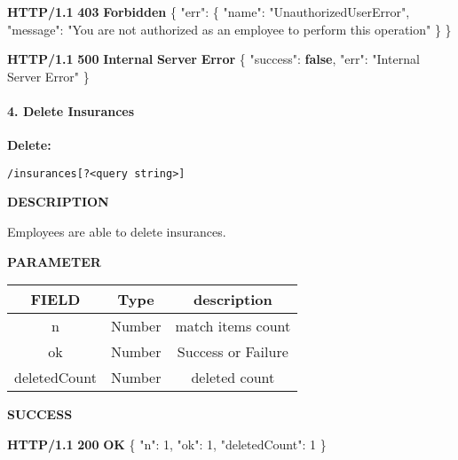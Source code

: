 \documentclass[
]{article}
\newenvironment{Shaded}{}{}
\newcommand{\DataTypeTok}[1]{\textcolor[rgb]{0.56,0.13,0.00}{#1}}
\newcommand{\DecValTok}[1]{\textcolor[rgb]{0.25,0.63,0.44}{#1}}
\newcommand{\ErrorTok}[1]{\textcolor[rgb]{1.00,0.00,0.00}{\textbf{#1}}}
\newcommand{\FunctionTok}[1]{\textcolor[rgb]{0.02,0.16,0.49}{#1}}
\newcommand{\KeywordTok}[1]{\textcolor[rgb]{0.00,0.44,0.13}{\textbf{#1}}}
\newcommand{\StringTok}[1]{\textcolor[rgb]{0.25,0.44,0.63}{#1}}
\begin{document}
\begin{Shaded}
\begin{Highlighting}[]
\ErrorTok{HTTP/1.1} \ErrorTok{403} \ErrorTok{Forbidden}
\FunctionTok{\{}
    \DataTypeTok{"err"}\FunctionTok{:} \FunctionTok{\{}
        \DataTypeTok{"name"}\FunctionTok{:} \StringTok{"UnauthorizedUserError"}\FunctionTok{,}
        \DataTypeTok{"message"}\FunctionTok{:} \StringTok{"You are not authorized as an employee to perform this operation"}
    \FunctionTok{\}}
\FunctionTok{\}}
\end{Highlighting}
\end{Shaded}

\begin{Shaded}
\begin{Highlighting}[]
\ErrorTok{HTTP/1.1} \ErrorTok{500} \ErrorTok{Internal} \ErrorTok{Server} \ErrorTok{Error}
\FunctionTok{\{}
    \DataTypeTok{"success"}\FunctionTok{:} \KeywordTok{false}\FunctionTok{,}
    \DataTypeTok{"err"}\FunctionTok{:} \StringTok{"Internal Server Error"}
\FunctionTok{\}}
\end{Highlighting}
\end{Shaded}

\hypertarget{header-n746}{%
\paragraph{4. Delete Insurances}\label{header-n746}}

\textbf{Delete:}

\begin{verbatim}
/insurances[?<query string>]
\end{verbatim}

\textbf{DESCRIPTION}

Employees are able to delete insurances.

\textbf{PARAMETER}

\begin{longtable}[]{@{}ccc@{}}
\toprule
FIELD & Type & description\tabularnewline
\midrule
\endhead
n & Number & match items count\tabularnewline
ok & Number & Success or Failure\tabularnewline
deletedCount & Number & deleted count\tabularnewline
\bottomrule
\end{longtable}

\textbf{SUCCESS}

\begin{Shaded}
\begin{Highlighting}[]
\ErrorTok{HTTP/1.1} \ErrorTok{200} \ErrorTok{OK}
\FunctionTok{\{}
    \DataTypeTok{"n"}\FunctionTok{:} \DecValTok{1}\FunctionTok{,}
    \DataTypeTok{"ok"}\FunctionTok{:} \DecValTok{1}\FunctionTok{,}
    \DataTypeTok{"deletedCount"}\FunctionTok{:} \DecValTok{1}
\FunctionTok{\}}
\end{Highlighting}
\end{Shaded}
\end{document}
